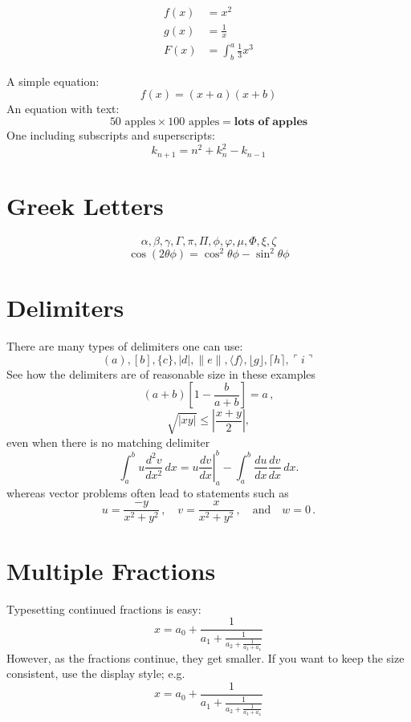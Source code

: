 


\begin{align}
    f(x) &= x^2\\
    g(x) &= \frac{1}{x}\\
    F(x) &= \int^a_b \frac{1}{3}x^3
\end{align}


A simple equation:
\[
 f(x)=(x+a)(x+b)
\]
An equation with text:
\begin{equation}
50 \text{ apples} \times 100 \text{ apples} =
\textbf{lots of apples}
\end{equation}
One including subscripts and superscripts:
\[ k_{n+1} = n^2 + k_n^2 - k_{n-1} \]
\section{Greek Letters}
\[ \alpha,  \beta,  \gamma, \Gamma, \pi, \Pi, \phi, \varphi, \mu, \Phi, \xi, \zeta \]
\[ \cos(2\theta\phi) = \cos^2 \theta\phi - \sin^2 \theta\phi \]
\section{Delimiters}
There are many types of delimiters one can use:
\[ ( a ), [ b ], \{ c \}, | d |, \| e \|,
\langle f \rangle, \lfloor g \rfloor,
\lceil h \rceil, \ulcorner i \urcorner \]
See how the delimiters are of reasonable size in these examples
\[
        \left(a+b\right)\left[1-\frac{b}{a+b}\right]=a\,,
\]
\[
        \sqrt{|xy|}\leq\left|\frac{x+y}{2}\right|,
\]
even when there is no matching delimiter
\[
        \int_a^bu\frac{d^2v}{dx^2}\,dx
        =\left.u\frac{dv}{dx}\right|_a^b
        -\int_a^b\frac{du}{dx}\frac{dv}{dx}\,dx.
\]
whereas vector problems often lead to statements such as
\[
        u=\frac{-y}{x^2+y^2}\,,\quad
        v=\frac{x}{x^2+y^2}\,,\quad\text{and}\quad
        w=0\,.
\]
\section{Multiple Fractions}
Typesetting continued fractions is easy:
\[
x = a_0 + \frac{1}{a_1 + \frac{1}{a_2 + \frac{1}{a_3 + a_4}}}
\]
However, as the fractions continue, they get smaller. If you want to keep the size consistent, use the display style; e.g.
\[
  x = a_0 + \frac{1}{\displaystyle a_1
          + \frac{1}{\displaystyle a_2
          + \frac{1}{\displaystyle a_3 + a_4}}}
\]
